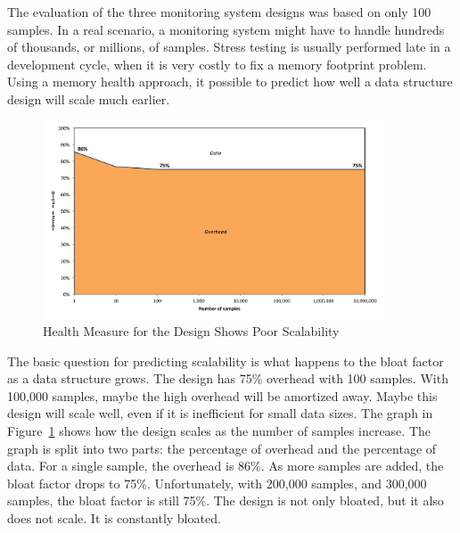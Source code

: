 The evaluation of the three monitoring system designs was based on only 100
samples. In a real scenario, a monitoring system might have to handle hundreds
of thousands, or millions, of samples. Stress testing is usually performed late
in a development cycle, when it is very costly to fix a memory footprint
problem. Using a memory health approach, it possible to predict how well a data
structure design will scale much earlier.
 
\begin{figure}
  \centering
   \includegraphics[width=0.9\textwidth]{part1/Figures/memoryhealth/scalable-health-treemap}
  \caption{Health Measure for the  Design Shows Poor Scalability}
  \label{fig:scalable-health-treemap}
\end{figure}
The basic question for predicting scalability is what happens to the bloat
factor as a data structure grows. The  design has 75\% overhead
with 100 samples. With 100,000 samples, maybe the high overhead will be
amortized away. Maybe this design will scale well, even if it is inefficient for
small data sizes. The graph in Figure~\ref{fig:scalable-health-treemap}
shows how the  design scales as the number of samples increase.
The graph is split into two parts: the percentage of overhead and the percentage
of data. For a single sample, the overhead is 86\%. As more samples are added,
the bloat factor drops to 75\%. Unfortunately, with 200,000 samples, and 300,000
samples, the bloat factor is still 75\%. The  design is not only
bloated, but it also does not scale. It is constantly bloated.



